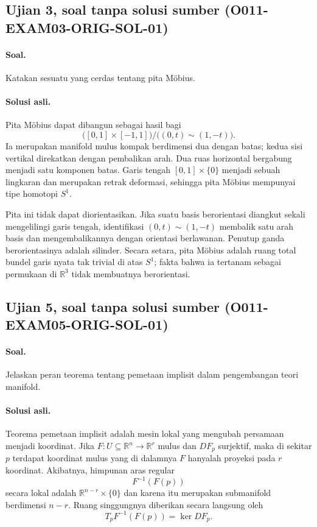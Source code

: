 \subsection*{Ujian 3, soal tanpa solusi sumber (O011-EXAM03-ORIG-SOL-01)}
\label{o011-exam03-orig-sol-01}

\paragraph{Soal.}
Katakan sesuatu yang cerdas tentang pita M\"obius.

\paragraph{Solusi asli.}
Pita M\"obius dapat dibangun sebagai hasil bagi
\[
 \bigl([0,1]\times[-1,1]\bigr)/\bigl((0,t)\sim(1,-t)\bigr).
\]
Ia merupakan manifold mulus kompak berdimensi dua dengan batas; kedua sisi
vertikal direkatkan dengan pembalikan arah. Dua ruas horizontal bergabung
menjadi satu komponen batas. Garis tengah $[0,1]\times\{0\}$ menjadi sebuah
lingkaran dan merupakan retrak deformasi, sehingga pita M\"obius mempunyai
tipe homotopi $S^1$.

Pita ini tidak dapat diorientasikan. Jika suatu basis berorientasi diangkut
sekali mengelilingi garis tengah, identifikasi $(0,t)\sim(1,-t)$ membalik satu
arah basis dan mengembalikannya dengan orientasi berlawanan. Penutup ganda
berorientasinya adalah silinder. Secara setara, pita M\"obius adalah ruang
total bundel garis nyata tak trivial di atas $S^1$; fakta bahwa ia tertanam
sebagai permukaan di $\mathbb R^3$ tidak membuatnya berorientasi.

\subsection*{Ujian 5, soal tanpa solusi sumber (O011-EXAM05-ORIG-SOL-01)}
\label{o011-exam05-orig-sol-01}

\paragraph{Soal.}
Jelaskan peran teorema tentang pemetaan implisit dalam pengembangan teori
manifold.

\paragraph{Solusi asli.}
Teorema pemetaan implisit adalah mesin lokal yang mengubah persamaan menjadi
koordinat. Jika $F\colon U\subseteq\mathbb R^n\to\mathbb R^r$ mulus dan
$D F_p$ surjektif, maka di sekitar $p$ terdapat koordinat mulus yang di
dalamnya $F$ hanyalah proyeksi pada $r$ koordinat. Akibatnya, himpunan aras
regular
\[
 F^{-1}(F(p))
\]
secara lokal adalah $\mathbb R^{n-r}\times\{0\}$ dan karena itu merupakan
submanifold berdimensi $n-r$. Ruang singgungnya diberikan secara langsung oleh
\[
 T_pF^{-1}(F(p))=\ker D F_p.
\]

